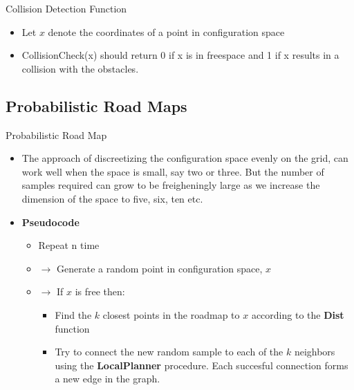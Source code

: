 \documentclass[10pt,mathserif]{beamer}
\begin{document}
\begin{frame}{Collision Detection Function}
\begin{itemize}
\item Let $x$ denote the coordinates of a point in configuration space
\item CollisionCheck(x) should return 0 if x is in freespace and 1 if x results in a collision with the
obstacles.
\end{itemize}
\end{frame}


\subsection{Probabilistic Road Maps}


\begin{frame}{Probabilistic Road Map}
\begin{itemize}
\item The approach of discreetizing the configuration space evenly on the grid, can work well when the space is small, say two or 
three. But the number of samples required can grow to be freigheningly large as we increase the dimension of the space to five, 
six, ten etc.
\item \textbf{Pseudocode}
\begin{itemize}
\item Repeat n time
\item $\rightarrow$ Generate a random point in configuration space, $x$
\item $\rightarrow$ If $x$ is free then:
\begin{itemize}
\item Find the $k$ closest points in the roadmap to $x$ according to the \textbf{Dist} function
\item Try to connect the new random sample to each of the $k$ neighbors using the \textbf{LocalPlanner} procedure. Each succesful 
connection forms a new edge in the graph.
\end{itemize}
\end{itemize}
\end{itemize}
\end{frame}
\end{document}
